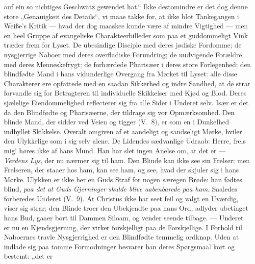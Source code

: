 \documentclass[12pt,a4paper]{book}
\begin{document}
auf ein so nichtiges Geschwätz gewendet hat.“ Ikke destomindre er det dog denne store
„Genauigkeit des Details“, vi maae takke for, at ikke blot Tankegangen i Weiße's Kritik
--- hvad der dog maaskee kunde være af mindre Vigtighed --- men en heel Gruppe af
evangeliske Charakteerbilleder som paa et guddommeligt Vink træder frem for Lyset. De
ubesindige Disciple med deres jødiske Fordomme; de nysgjerrige Naboer med deres
overfladiske Forundring; de uudvigende Forældre med deres Menneskefrygt; de forhærdede
Pharisæer i deres store Forlegenhed; den blindfødte Mand i hans vidunderlige Overgang fra
Mørket til Lyset: alle disse Charakterer ere opfattede med en saadan Sikkerhed og indre
Sandhed, at de strar forvandle sig for Betragteren til individuelle Skikkelser med Kjød og
Blod. Deres sjælelige Eiendommelighed reflecterer sig fra alle Sider i Underet selv. Især
er det da den Blindfødte og Pharisæerne, der tildrage sig vor Opmærksomhed. Den blinde
Mand, der sidder ved Veien og tigger (V.\ 8), er som en i Dunkelhed indhyllet Skikkelse.
Overalt omgiven af et aandeligt og sandseligt Mørke, hviler den Ulykkelige som i sig selv
alene. De Lidendes sædvanlige Udraab: Herre, frels mig! høres ikke af hans Mund. Han har
slet ingen Anelse om, at det er --- \emph{Verdens Lys}, der nu nærmer sig til ham. Den
Blinde kan ikke see sin Frelser; men Frelseren, der staaer hos ham, kan see ham, og see,
hvad der skjuler sig i hans Mørke. Ulykken er ikke her en Guds Straf for nogen særegen
Brøde: han fødtes blind, \emph{paa det at Guds Gjerninger skulde blive aabenbarede paa
ham.} Saaledes forberedes Underet (V.\ 9). At Christus ikke har seet feil og valgt en
Uværdig, viser sig strar; den Blinde troer den Ubekjendte paa hans Ord, adlyder ubetinget
hans Bud, gaaer bort til Dammen Siloam, og vender seende tilbage. --- Underet er nu en
Kjendsgjerning, der virker forskjelligt paa de Forskjellige. I
Forhold til Naboernes travle Nysgjerrighed er den Blindfødte temmelig ordknap. Uden at
indlade sig paa tomme Formodninger besvarer han deres Spørgsmaal kort og bestemt: „det er
\end{document}
